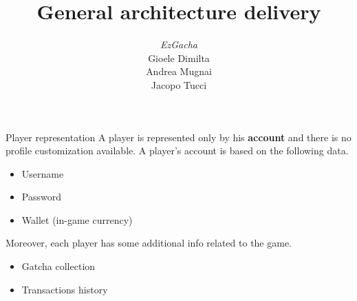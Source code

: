 \documentclass[12pt,aspectratio=169,notheorems]{beamer}
\title{\LARGE General architecture delivery}
\author{{\large \emph{EzGacha} \\[3ex]} Gioele Dimilta \\ Andrea Mugnai \\ Jacopo Tucci}
\date{}
\begin{document}
\maketitle

\begin{frame}{Player representation}
    A player is represented only by his \textbf{account} and there is no profile customization available. A player's account is based on the following data.
    \begin{itemize}
        \item Username
        \item Password
        \item Wallet (in-game currency)
    \end{itemize}
    Moreover, each player has some additional info related to the game.
    \begin{itemize}
        \item Gatcha collection
        \item Transactions history
    \end{itemize}
\end{frame}
\end{document}
